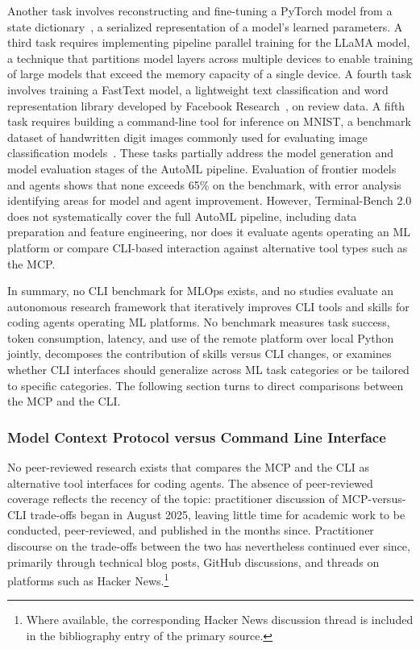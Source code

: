 \documentclass[
english,                 %
bibtex,                  %
includeExtraAbstracts, %
]{kththesis}
\numberwithin{listing}{chapter}
\begin{document}
Another task involves reconstructing and fine-tuning a PyTorch model from a state dictionary~\cite{paszke_pytorch_2019}, a serialized representation of a model's learned parameters. A third task requires implementing pipeline parallel training for the \gls{LLaMA} model, a technique that partitions model layers across multiple devices to enable training of large models that exceed the memory capacity of a single device. A fourth task involves training a FastText model, a lightweight text classification and word representation library developed by Facebook Research~\cite{joulin_fasttextzip_2016}, on review data. A fifth task requires building a command-line tool for inference on \gls{MNIST}, a benchmark dataset of handwritten digit images commonly used for evaluating image classification models~\cite{lecun_mnist_2010}. These tasks partially address the model generation and model evaluation stages of the \gls{AutoML} pipeline. Evaluation of frontier models and agents shows that none exceeds 65\% on the benchmark, with error analysis identifying areas for model and agent improvement. However, Terminal-Bench 2.0 does not systematically cover the full \gls{AutoML} pipeline, including data preparation and feature engineering, nor does it evaluate agents operating an \gls{ML} platform or compare \gls{CLI}-based interaction against alternative tool types such as the \gls{MCP}. 

In summary, no \gls{CLI} benchmark for \gls{MLOps} exists, and no studies evaluate an autonomous research framework that iteratively improves \gls{CLI} tools and skills for coding agents operating \gls{ML} platforms. No benchmark measures task success, token consumption, latency, and use of the remote platform over local Python jointly, decomposes the contribution of skills versus \gls{CLI} changes, or examines whether \gls{CLI} interfaces should generalize across \gls{ML} task categories or be tailored to specific categories. The following section turns to direct comparisons between the \gls{MCP} and the \gls{CLI}.

\subsubsection{Model Context Protocol versus Command Line Interface}

No peer-reviewed research exists that compares the \gls{MCP} and the \gls{CLI} as alternative tool interfaces for coding agents. The absence of peer-reviewed coverage reflects the recency of the topic: practitioner discussion of \gls{MCP}-versus-\gls{CLI} trade-offs began in August 2025, leaving little time for academic work to be conducted, peer-reviewed, and published in the months since. Practitioner discourse on the trade-offs between the two has nevertheless continued ever since, primarily through technical blog posts, GitHub discussions, and threads on platforms such as Hacker News.\footnote{Where available, the corresponding Hacker News discussion thread is included in the bibliography entry of the primary source.}
\end{document}
